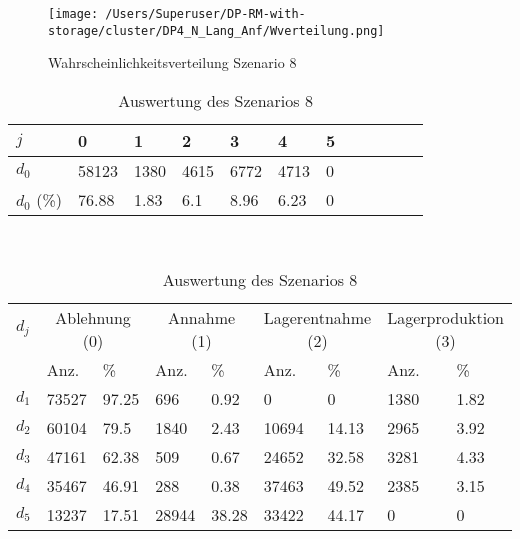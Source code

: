 \clearpage
\begin{figure}[h!]
  \begin{center}
    \texttt{[image: /Users/Superuser/DP-RM-with-storage/cluster/DP4\_N\_Lang\_Anf/Wverteilung.png]}
    \caption{Wahrscheinlichkeitsverteilung Szenario 8}  \label{SB8}
  \end{center}
\end{figure}

\begin{table}[h!]
\renewcommand{\arraystretch}{1.5}
  \begin{center}
    \caption{Auswertung des Szenarios 8}  \label{AS8}
    \vspace*{3mm}
    \begin{tabular}{l l l l l l l l l l l l }  \hline 
         $j$ & 0 & 1  & 2 & 3 & 4  & 5   \\  \hline
$d_{0}$ &  58123 &  1380 &  4615 &  6772 &  4713 &  0 \\
$d_{0}$ (\%) &  76.88 &  1.83 &   6.1 &  8.96 &  6.23 &  0 \\
\hline
    \end{tabular} \\[3mm]
        \begin{tabular}{ l l l l l l l l l}   \hline    %
    $d_j$ & \multicolumn{2}{c}{Ablehnung (0)} & \multicolumn{2}{c}{Annahme (1)}  & \multicolumn{2}{c}{Lagerentnahme (2)} & \multicolumn{2}{c}{Lagerproduktion (3)}\\
    & Anz. & \% & Anz. & \% & Anz. & \% & Anz. & \% \\ \hline 
$d_{1}$ &  73527 &  97.25 &    696 &   0.92 &    0 &    0 &  1380 &  1.82 \\
$d_{2}$ &  60104 &   79.5 &   1840 &   2.43 &  10694 &  14.13 &  2965 &  3.92 \\
$d_{3}$ &  47161 &  62.38 &    509 &   0.67 &  24652 &  32.58 &  3281 &  4.33 \\
$d_{4}$ &  35467 &  46.91 &    288 &   0.38 &  37463 &  49.52 &  2385 &  3.15 \\
$d_{5}$ &  13237 &  17.51 &  28944 &  38.28 &  33422 &  44.17 &   0 &   0 \\
          \hline
   \end{tabular} \\[3mm]
     \end{center}
\end{table}



